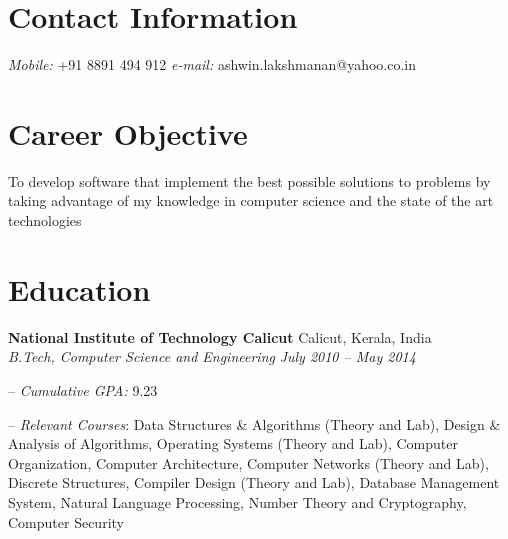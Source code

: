 \documentclass[margin,line]{resume}
\begin{document}


\begin{resume}

    \section{\mysidestyle Contact Information}
    
    
    \textit{Mobile:} +91 8891 494 912    \hfill    \textit{e-mail:} ashwin.lakshmanan@yahoo.co.in
        
      \vspace{+0.5mm}
	
	
    \section{\mysidestyle Career Objective}

        To develop software that implement the best possible solutions to problems by taking advantage of my knowledge in computer science and the state of the art technologies

										
    \section{\mysidestyle Education}

    \textbf{National Institute of Technology Calicut} \hfill Calicut, Kerala, India
    \\
    \textit{B.Tech, Computer Science and Engineering} \hfill \textit{ July 2010 -- May 2014}
    
    \begin{compactitem}
        \item[--] \textit{Cumulative GPA:} 9.23 
        \item[--] \textit{Relevant Courses}: Data Structures \& Algorithms (Theory and Lab), Design \& Analysis of Algorithms, Operating Systems (Theory and Lab), Computer Organization, Computer Architecture, Computer Networks (Theory and Lab), Discrete Structures, Compiler Design (Theory and Lab), Database Management System, Natural Language Processing, Number Theory and Cryptography, Computer Security
    \end{compactitem}
    

\end{resume}
\end{document}
